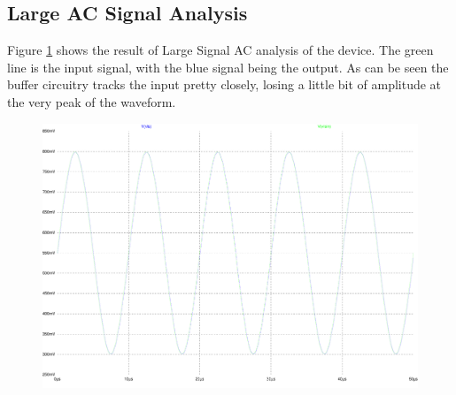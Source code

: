 \subsection{Large AC Signal Analysis}

Figure \ref{fig:Lac} shows the result of Large Signal AC analysis of the device.
The green line is the input signal, with the blue signal being the output.
As can be seen the buffer circuitry tracks the input pretty closely, losing a little bit of amplitude at the very peak of the waveform.

\begin{figure}[H]
	\centering
	\includegraphics[width=\textwidth]{./images/LargeSignal-out.pdf}
	\caption{}
	\label{fig:Lac}
\end{figure}
